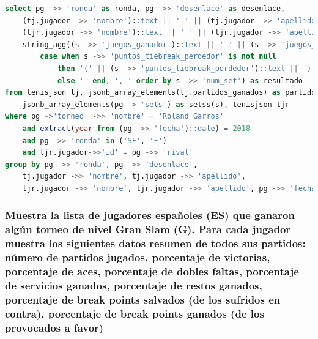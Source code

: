 \documentclass[10pt]{opticajnl}
\begin{document}
\begin{lstlisting}[language=SQL]
select pg ->> 'ronda' as ronda, pg ->> 'desenlace' as desenlace, 
	(tj.jugador ->> 'nombre')::text || ' ' || (tj.jugador ->> 'apellido')::text as ganador, 
	(tjr.jugador ->> 'nombre')::text || ' ' || (tjr.jugador ->> 'apellido')::text as perdedor, 
	string_agg((s ->> 'juegos_ganador')::text || '-' || (s ->> 'juegos_perdedor')::text || 
		case when s ->> 'puntos_tiebreak_perdedor' is not null 
			then '(' || (s ->> 'puntos_tiebreak_perdedor')::text || ')' 
			else '' end, ', ' order by s ->> 'num_set') as resultado
from tenisjson tj, jsonb_array_elements(tj.partidos_ganados) as partidos(pg), 
	jsonb_array_elements(pg -> 'sets') as setss(s), tenisjson tjr
where pg ->'torneo' ->> 'nombre' = 'Roland Garros'
    and extract(year from (pg ->> 'fecha')::date) = 2018
    and pg ->> 'ronda' in ('SF', 'F')
    and tjr.jugador->>'id' = pg ->> 'rival'
group by pg ->> 'ronda', pg ->> 'desenlace', 
	tj.jugador ->> 'nombre', tj.jugador ->> 'apellido', 
	tjr.jugador ->> 'nombre', tjr.jugador ->> 'apellido', pg ->> 'fecha'
\end{lstlisting}





\subsubsection{Muestra la lista de jugadores españoles (ES) que ganaron algún torneo de nivel Gran Slam (G). Para cada jugador muestra los siguientes datos resumen de todos sus partidos: número de partidos jugados, porcentaje de victorias, porcentaje de aces, porcentaje de dobles faltas, porcentaje de servicios ganados, porcentaje de restos ganados, porcentaje de break points salvados (de los sufridos en contra), porcentaje de break points ganados (de los provocados a favor)}
\end{document}
